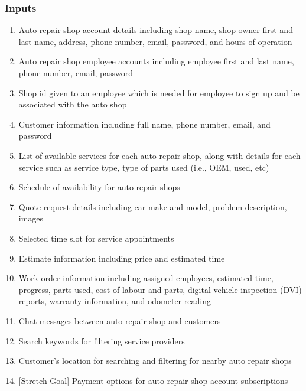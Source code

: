 \documentclass{article}
\begin{document}
\subsubsection{Inputs}
\begin{enumerate}
	\item Auto repair shop account details including shop name, shop owner first and last name, address,
	      phone number, email, password, and hours of operation
	\item Auto repair shop employee accounts including employee first and last name, phone number, email,
	      password
	\item Shop id given to an employee which is needed for employee to sign up and be associated with the
	      auto shop
	\item Customer information including full name, phone number, email, and password
	\item List of available services for each auto repair shop, along with details for each service such as
	      service type, type of parts used {(i.e., OEM, used, etc)}
	\item Schedule of availability for auto repair shops
	\item Quote request details including car make and model, problem description, images
	\item Selected time slot for service appointments
	\item Estimate information including price and estimated time
	\item Work order information including assigned employees, estimated time, progress, parts used, cost of
	      labour and parts, digital vehicle inspection {(DVI)} reports, warranty information, and odometer
	      reading
	\item Chat messages between auto repair shop and customers
	\item Search keywords for filtering service providers
	\item Customer's location for searching and filtering for nearby auto repair shops
	\item {[Stretch Goal]} Payment options for auto repair shop account subscriptions
\end{enumerate}
\end{document}
